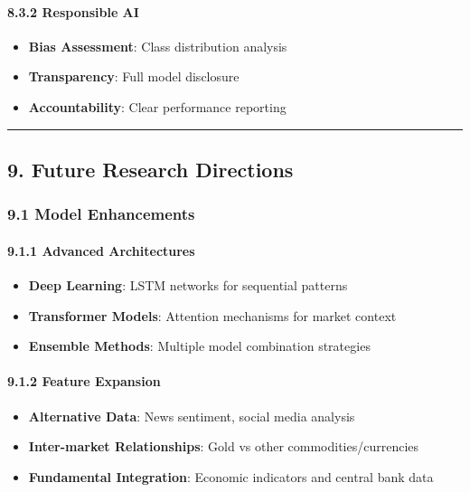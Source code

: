 \paragraph{8.3.2 Responsible AI}\label{responsible-ai}

\begin{itemize}
\tightlist
\item
  \textbf{Bias Assessment}: Class distribution analysis
\item
  \textbf{Transparency}: Full model disclosure
\item
  \textbf{Accountability}: Clear performance reporting
\end{itemize}

\begin{center}\rule{0.5\linewidth}{0.5pt}\end{center}

\subsection{9. Future Research
Directions}\label{future-research-directions}

\subsubsection{9.1 Model Enhancements}\label{model-enhancements}

\paragraph{9.1.1 Advanced Architectures}\label{advanced-architectures}

\begin{itemize}
\tightlist
\item
  \textbf{Deep Learning}: LSTM networks for sequential patterns
\item
  \textbf{Transformer Models}: Attention mechanisms for market context
\item
  \textbf{Ensemble Methods}: Multiple model combination strategies
\end{itemize}

\paragraph{9.1.2 Feature Expansion}\label{feature-expansion}

\begin{itemize}
\tightlist
\item
  \textbf{Alternative Data}: News sentiment, social media analysis
\item
  \textbf{Inter-market Relationships}: Gold vs other
  commodities/currencies
\item
  \textbf{Fundamental Integration}: Economic indicators and central bank
  data
\end{itemize}

